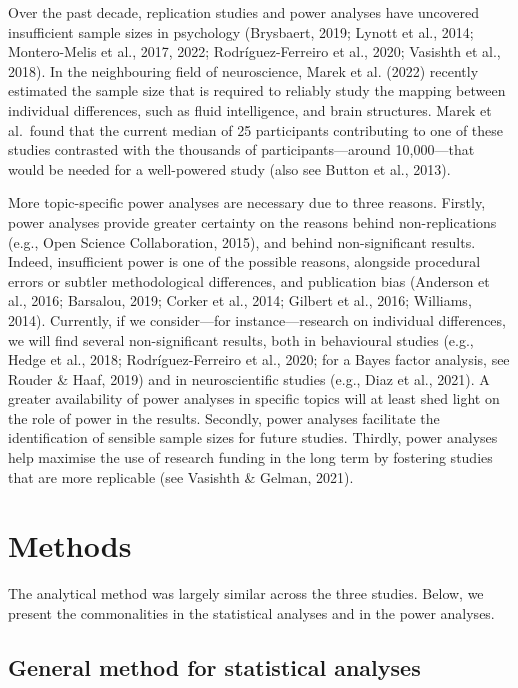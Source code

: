 \documentclass[
  12pt,
  man,floatsintext]{apa7}
\begin{document}
Over the past decade, replication studies and power analyses have uncovered insufficient sample sizes in psychology (Brysbaert, 2019; Lynott et al., 2014; Montero-Melis et al., 2017, 2022; Rodríguez-Ferreiro et al., 2020; Vasishth et al., 2018). In the neighbouring field of neuroscience, Marek et al. (2022) recently estimated the sample size that is required to reliably study the mapping between individual differences, such as fluid intelligence, and brain structures. Marek et al.~found that the current median of 25 participants contributing to one of these studies contrasted with the thousands of participants---around 10,000---that would be needed for a well-powered study (also see Button et al., 2013).

More topic-specific power analyses are necessary due to three reasons. Firstly, power analyses provide greater certainty on the reasons behind non-replications (e.g., Open Science Collaboration, 2015), and behind non-significant results. Indeed, insufficient power is one of the possible reasons, alongside procedural errors or subtler methodological differences, and publication bias (Anderson et al., 2016; Barsalou, 2019; Corker et al., 2014; Gilbert et al., 2016; Williams, 2014). Currently, if we consider---for instance---research on individual differences, we will find several non-significant results, both in behavioural studies (e.g., Hedge et al., 2018; Rodríguez-Ferreiro et al., 2020; for a Bayes factor analysis, see Rouder \& Haaf, 2019) and in neuroscientific studies (e.g., Diaz et al., 2021). A greater availability of power analyses in specific topics will at least shed light on the role of power in the results. Secondly, power analyses facilitate the identification of sensible sample sizes for future studies. Thirdly, power analyses help maximise the use of research funding in the long term by fostering studies that are more replicable (see Vasishth \& Gelman, 2021).

\hypertarget{methods}{%
\section{Methods}\label{methods}}

The analytical method was largely similar across the three studies. Below, we present the commonalities in the statistical analyses and in the power analyses.

\hypertarget{general-statistical-analyses}{%
\subsection{General method for statistical analyses}\label{general-statistical-analyses}}
\end{document}
